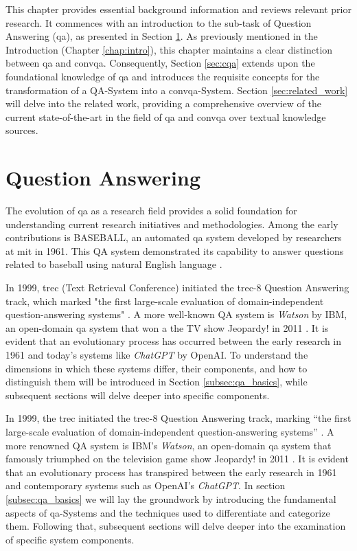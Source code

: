 This chapter provides essential background information and reviews relevant prior research. It commences with an introduction to the sub-task of Question Answering (\gls{qa}), as presented in Section \ref*{sec:qa}. As previously mentioned in the Introduction (Chapter \ref{chap:intro}), this chapter maintains a clear distinction between \gls{qa} and \gls{convqa}. Consequently, Section \ref{sec:cqa} extends upon the foundational knowledge of \gls*{qa} and introduces the requisite concepts for the transformation of a QA-System into a \gls{convqa}-System. Section \ref{sec:related_work} will delve into the related work, providing a comprehensive overview of the current state-of-the-art in the field of \gls{qa} and \gls{convqa} over textual knowledge sources.

\section{Question Answering}
\label{sec:qa}

The evolution of \gls{qa} as a research field provides a solid foundation for understanding current research initiatives and methodologies. Among the early contributions is BASEBALL, an automated \gls{qa} system developed by researchers at \gls{mit} in 1961. This QA system demonstrated its capability to answer questions related to baseball using natural English language \cite{green_baseball_1961}.


In 1999, \gls{trec} (Text Retrieval Conference) initiated the \gls{trec}-8 Question Answering track, which marked "the first large-scale evaluation of domain-independent question-answering systems" \cite{voorhees_trec-8_1999}. A more well-known QA system is \textit{Watson} by IBM, an open-domain \gls{qa} system that won a the TV show Jeopardy! in 2011 \cite{ferrucci_introduction_2012}. It is evident that an evolutionary process has occurred between the early research in 1961 and today's systems like \textit{ChatGPT} by OpenAI. To understand the dimensions in which these systems differ, their components, and how to distinguish them will be introduced in Section \ref{subsec:qa_basics}, while subsequent sections will delve deeper into specific components.

In 1999, the \gls{trec} initiated the \gls{trec}-8 Question Answering track, marking \enquote{the first large-scale evaluation of domain-independent question-answering systems} \cite{voorhees_trec-8_1999}. A more renowned QA system is IBM's \textit{Watson}, an open-domain \gls{qa} system that famously triumphed on the television game show Jeopardy! in 2011 \cite{ferrucci_introduction_2012}. It is evident that an evolutionary process has transpired between the early research in 1961 and contemporary systems such as OpenAI's \textit{ChatGPT}. In section \ref{subsec:qa_basics} we will lay the groundwork by introducing the fundamental aspects of \gls{qa}-Systems and the techniques used to differentiate and categorize them. Following that, subsequent sections will delve deeper into the examination of specific system components.


